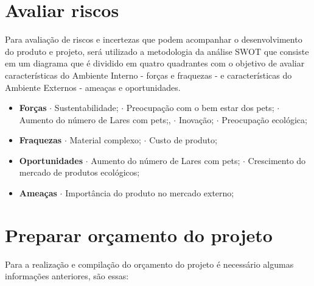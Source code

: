 \documentclass[
	12pt,				%
	openright,			%
	oneside,			%
	a4paper,			%
	english,			%
	french,				%
	spanish,			%
	brazil				%
	]{abntex2}
\begin{document}
\section{Avaliar riscos}

Para avaliação de riscos e incertezas que podem acompanhar o desenvolvimento do produto e projeto, será utilizado a metodologia da análise SWOT que consiste em um diagrama que é dividido em quatro quadrantes com o objetivo de avaliar características do Ambiente Interno - forças e fraquezas -  e características do Ambiente Externos - ameaças e oportunidades.

\begin{itemize}
\item \textbf{Forças}
\subitem $\cdot$ Sustentabilidade;
\subitem $\cdot$ Preocupação com o bem estar dos pets;
\subitem $\cdot$ Aumento do número de Lares com pets;,
\subitem $\cdot$ Inovação;
\subitem $\cdot$ Preocupação ecológica;
\item \textbf{Fraquezas}
\subitem $\cdot$ Material complexo;
\subitem $\cdot$ Custo de produto;
\item \textbf{Oportunidades}
\subitem $\cdot$ Aumento do número de Lares com pets;
\subitem $\cdot$ Crescimento do mercado de produtos ecológicos;
\item \textbf{Ameaças}
\subitem $\cdot$ Importância do produto no mercado externo;
\end{itemize}

\section{Preparar orçamento do projeto}

Para a realização e compilação do orçamento do projeto é necessário algumas informações anteriores, são essas:
\end{document}
